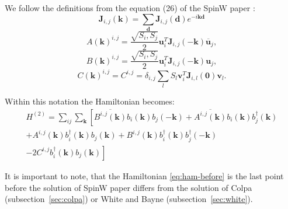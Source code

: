 \documentclass[a4paper,12pt]{article}
\begin{document}
        We follow the definitions from the equation (26) of the SpinW paper \cite{toth2015linear}:
        \begin{equation}
            \boldsymbol{J}_{i,j}(\boldsymbol{k}) = \sum_{\boldsymbol{d}}\boldsymbol{J}_{i,j}(\boldsymbol{d})e^{-i\boldsymbol{k}\boldsymbol{d}}
        \end{equation}
        \begin{equation}
            A(\boldsymbol{k})^{i,j} = \dfrac{\sqrt{S_i, S_j}}{2}\boldsymbol{u}^T_i\boldsymbol{J}_{i,j}(-\boldsymbol{k})\overline{\boldsymbol{u}}_j,
        \end{equation}
        \begin{equation}
            B(\boldsymbol{k})^{i,j} = \dfrac{\sqrt{S_i, S_j}}{2}\boldsymbol{u}^T_i\boldsymbol{J}_{i,j}(-\boldsymbol{k})\boldsymbol{u}_j,
        \end{equation}
        \begin{equation}
            C(\boldsymbol{k})^{i,j} = C^{i,j} = \delta_{i,j}\sum_{l}S_l \boldsymbol{v}^T_i\boldsymbol{J}_{i, l}(\boldsymbol{0})\boldsymbol{v}_l.
        \end{equation}

        Within this notation the Hamiltonian becomes:
        \begin{multline}
            H^{(2)} = \sum_{ij}\sum_{\boldsymbol{k}}\left[\overline{B^{i,j}(\boldsymbol{k})}b_{i}(\boldsymbol{k})b_{j}(-\boldsymbol{k}) +
            \overline{A^{i,j}(\boldsymbol{k})}b_{i}(\boldsymbol{k})b^{\dag}_{j}(\boldsymbol{k})\right. \\+ 
            A^{i,j}(\boldsymbol{k})b^{\dag}_{i}(\boldsymbol{k})b_{j}(\boldsymbol{k}) +
            B^{i,j}(\boldsymbol{k})b^{\dag}_{i}(\boldsymbol{k})b^{\dag}_{j}(-\boldsymbol{k}) \\-
            \left.2 C^{i,j}b^{\dag}_{i}(\boldsymbol{k})b_{j}(\boldsymbol{k})\right] \label{eq:ham-before}
        \end{multline}

        It is important to note, that the Hamiltonian \eqref{eq:ham-before} is the last point before the solution of SpinW paper \cite{toth2015linear} 
        differs from the solution of Colpa (subsection~\ref{sec:colpa}) or White and Bayne (subsection~\ref{sec:white}).
\end{document}
